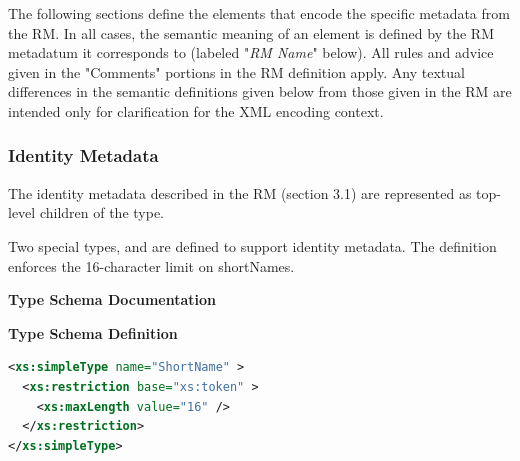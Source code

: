 \documentclass[11pt,a4paper]{ivoa}
\begin{document}
\endgroup


The following sections define the elements that encode the specific
metadata from the RM.  In all cases, the semantic meaning of an element
is defined by the RM metadatum it corresponds to (labeled "\emph{RM
Name}" below).  All rules and advice given in the "Comments" portions in
the RM definition apply.  Any textual differences in the semantic
definitions given below from those given in the RM are intended only for
clarification for the XML encoding context.  


\subsubsection{Identity Metadata}


The identity metadata described in the RM (section
3.1) are represented as top-level children of the
 type.


Two special types,  and
 are defined to support identity
metadata.  The  definition enforces the
16-character limit on shortNames.  

\begingroup
      	\renewcommand*\descriptionlabel[1]{%
      	\hbox to 5.5em{\emph{#1}\hfil}}\vspace{2ex}\noindent\textbf{ Type Schema Documentation}




\vspace{1ex}\noindent\textbf{ Type Schema Definition}

\begin{lstlisting}[language=XML,basicstyle=\footnotesize]
<xs:simpleType name="ShortName" >
  <xs:restriction base="xs:token" >
    <xs:maxLength value="16" />
  </xs:restriction>
</xs:simpleType>
\end{lstlisting}\endgroup
\end{document}
